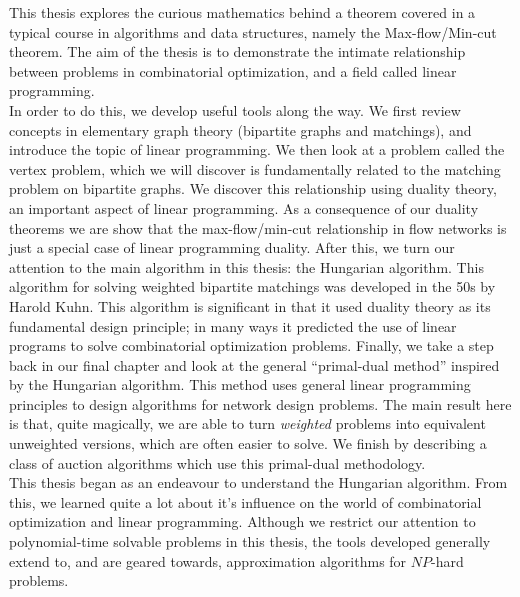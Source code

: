 This thesis explores the curious mathematics behind a theorem covered in a typical course in 
algorithms and data structures, namely the Max-flow/Min-cut theorem. The aim of the thesis is to 
demonstrate the intimate relationship between problems in combinatorial optimization, and a field 
called linear programming. \\
In order to do this, we develop useful tools along the way. We first 
review concepts in elementary graph theory (bipartite graphs and matchings), and introduce the topic 
of linear programming. We then look at a problem called the vertex problem, which we will discover 
is fundamentally related to the matching problem on bipartite graphs. We discover this relationship 
using duality theory, an important aspect of linear programming. As a consequence of our duality 
theorems we are show that the max-flow/min-cut relationship in flow networks is just a special case of 
linear programming duality. After this, we turn our attention to the main algorithm in this thesis:
the Hungarian algorithm. This algorithm for solving weighted bipartite matchings was developed in the 
50s by Harold Kuhn. This algorithm is significant in that it used duality theory as its fundamental 
design principle; in many ways it predicted the use of linear programs to solve combinatorial 
optimization problems. Finally, we take a step back in our final chapter and look at the general 
``primal-dual method'' inspired by the Hungarian algorithm. This method uses general linear programming 
principles to design algorithms for network design problems. The main result here is that, quite 
magically, we are able to turn \emph{weighted} problems into equivalent unweighted versions, which 
are often easier to solve. We finish by describing a class of auction algorithms which use this 
primal-dual methodology.\\
This thesis began as an endeavour to understand the Hungarian algorithm. From this, we learned 
quite a lot about it's influence on the world of combinatorial optimization and linear programming. 
Although we restrict our attention to polynomial-time solvable problems in this thesis, the tools 
developed generally extend to, and are geared towards, approximation algorithms for $NP$-hard 
problems. 
